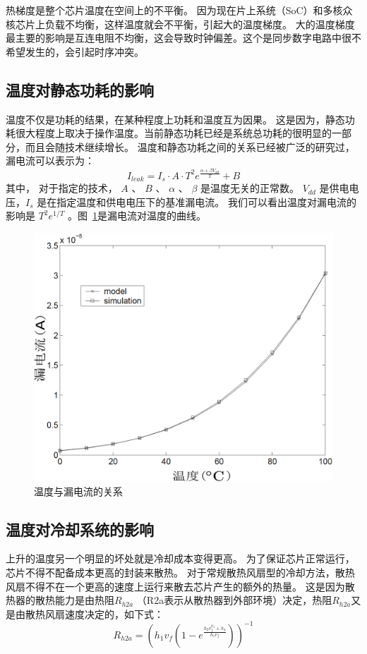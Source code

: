 热梯度是整个芯片温度在空间上的不平衡。
因为现在片上系统（SoC）和多核众核芯片上负载不均衡，这样温度就会不平衡，引起大的温度梯度。
大的温度梯度最主要的影响是互连电阻不均衡，这会导致时钟偏差。这个是同步数字电路中很不希望发生的，会引起时序冲突。

\subsection{温度对静态功耗的影响}\label{sec:leakage}

温度不仅是功耗的结果，在某种程度上功耗和温度互为因果。
这是因为，静态功耗很大程度上取决于操作温度。当前静态功耗已经是系统总功耗的很明显的一部分，而且会随技术继续增长。
温度和静态功耗之间的关系已经被广泛的研究过\cite{liao2005temperature}，漏电流可以表示为：
\begin{equation}
I_{leak} = I_s \cdot A \cdot T^2e^{\frac{\alpha + \beta V_{dd}}{T}}+B
\end{equation}
其中， 对于指定的技术， $A$ 、 $B$ 、  $\alpha$ 、 $\beta$ 是温度无关的正常数。
$V_{dd}$ 是供电电压，$I_s$ 是在指定温度和供电电压下的基准漏电流。
我们可以看出温度对漏电流的影响是 $T^2e^{1/T}$ 。图~\ref{fig:leakage}是漏电流对温度的曲线。
\begin{figure}
  \centering
    \includegraphics[width=0.7\columnwidth]{fig/leakage}
  \caption{温度与漏电流的关系\cite{zhang2003hotleakage}}\label{fig:leakage}
\end{figure}

\subsection{温度对冷却系统的影响}\label{sec:cooling}

上升的温度另一个明显的坏处就是冷却成本变得更高。
为了保证芯片正常运行，芯片不得不配备成本更高的封装来散热。
对于常规散热风扇型的冷却方法，散热风扇不得不在一个更高的速度上运行来散去芯片产生的额外的热量。
这是因为散热器的散热能力是由热阻$R_{h2a}$ （R2a表示从散热器到外部环境）决定，热阻$R_{h2a}$又是由散热风扇速度决定的，如下式：
\begin{equation}\label{eq:cooling}
R_{h2a} = (h_1v_f(1-e^{\frac{h_2v_f^{h_3}+h_4}{h_1v_f}}))^{-1}
\end{equation}

